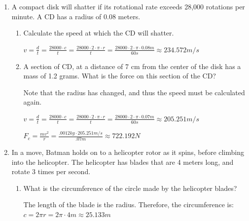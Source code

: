 \documentclass[letterpaper, 12pt]{article}
\begin{document}
\begin{enumerate}
\begin{enumerate}
	\end{enumerate}
	
	\item A compact disk will shatter if its rotational rate exceeds 28,000 rotations per minute.  A CD has a radius of 0.08 meters.
		\begin{enumerate}
			\item Calculate the speed at which the CD will shatter.
				
			\color{red}
			\begin{center}
				\vspace{.25in} 	
				$ v = \frac{d}{t} = \frac{28000 \cdot c} {t} = \frac{28000 \cdot 2 \cdot \pi \cdot r}{t} = \frac{28000 \cdot 2 \cdot \pi \cdot 0.08m}{60s} \approx 234.572 m/s  	$
			\end{center}
			\color{black}
			\vspace{.25in} 	
				
				
			\item A section of CD, at a distance of 7 cm from the center of the disk has a mass of 1.2 grams. What is the force on this section of the CD?
		\begin{center}
		\vspace{.15in}
		\color{red}
		Note that the radius has changed, and thus the speed must be calculated again. 
		\vspace{0.15in}
		
		$ v = \frac{d}{t} = \frac{28000 \cdot c} {t} = \frac{28000 \cdot 2 \cdot \pi \cdot r}{t} = \frac{28000 \cdot 2 \cdot \pi \cdot 0.07m}{60s} \approx 205.251 m/s  	$
		
		$F_c = \frac{m v^2}{r} = \frac{.0012 kg \cdot 205.251 m/s} {.07 m} \approx 722.192 N$
			\end{center}
	\color{black}
	\vspace{.35in} 	
				
				
				
				
				
		\end{enumerate}
	
	\item In a move, Batman holds on to a helicopter rotor as it spins, before climbing into the helicopter. The helicopter has blades that are 4 meters long, and rotate 3 times per second.  
	\begin{enumerate}
		\item What is the circumference of the circle made by the helicopter blades?   
			\vspace{.15in}
	\color{red}
	\begin{center}
		The length of the blade is the radius.  Therefore, the circumference is:
		$c = 2 \pi r = 2 \pi \cdot 4 m \approx 25.133 m$
\end{center}
\color{black}
\vspace{.25in} 	
									

\end{enumerate}
\end{enumerate}
\end{document}
